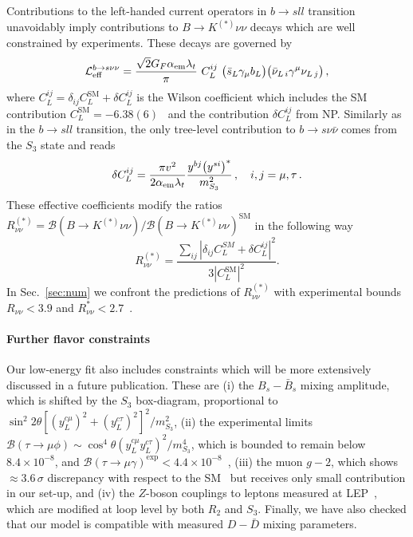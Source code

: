\documentclass[aps,prd,superscriptaddress,twocolumn,secnumarabic]{revtex4-1}
\begin{document}
Contributions to the left-handed current operators in $b\to s l l$ transition unavoidably imply contributions to $B\to K^{(\ast)}\nu\nu$ decays which are well constrained by experiments. These decays are governed by
%
\begin{equation}
\mathcal{L}_{\mathrm{eff}}^{b\to s\nu\nu}= \dfrac{\sqrt{2}G_F \alpha_{\mathrm{em}} \lambda_t}{\pi} ~C_L^{ij}~\big{(}\bar{s}_L\gamma_\mu b_L\big{)}\big{(}\bar{\nu}_{L\,i} \gamma^\mu \nu_{L\,j} \big{)}\,,
\end{equation}
%
where $C_L^{ij}=\delta_{ij}C_{L}^{\mathrm{SM}}+\delta C_L^{ij}$ is the Wilson coefficient which includes the SM contribution $C_{L}^{\mathrm{SM}}=-6.38(6)$~\cite{Altmannshofer:2009ma} and the contribution $\delta C_L^{ij}$ from NP. Similarly as in the $b\to s l l$ transition, the only tree-level contribution to $b\to s \nu\bar{\nu}$ comes from the $S_3$ state and reads~\cite{Dorsner:2017ufx}
%
\begin{equation}
\delta C_L^{ij} = \dfrac{\pi v^2}{2\alpha_{\mathrm{em}} \lambda_t} \dfrac{y^{bj} \big{(}y^{si}\big{)}^\ast}{m_{S_3}^2}\,,\quad i,j=\mu,\tau\,.
\end{equation}
%
These effective coefficients modify the ratios $R_{\nu\nu}^{(\ast)}=\mathcal{B}(B\to K^{(\ast)}\nu\nu)/\mathcal{B}(B\to K^{(\ast)}\nu\nu)^{\mathrm{SM}}$ in the following way
%
\begin{equation}
\label{eq:Rnunu}
R_{\nu\nu}^{(\ast)} = \dfrac{\sum_{ij}|\delta_{ij}C_L^{SM}+\delta C_{L}^{ij}|^2}{3|C_L^{\mathrm{SM}}|^2}.
\end{equation}
%
In Sec.~\ref{sec:num} we confront the predictions of $R_{\nu\nu}^{(\ast)}$ with experimental bounds $R_{\nu\nu}<3.9$ and $R_{\nu\nu}^{\ast}<2.7$~\cite{Grygier:2017tzo}.

\paragraph*{Further flavor constraints}
Our low-energy fit also includes constraints which will be more
extensively discussed in a future publication. These are (i) the
$B_s-\bar{B}_s$ mixing amplitude, which is shifted by the $S_3$
box-diagram, proportional to %
$\sin^2 2\theta \left[(y_L^{c\mu})^2 + (y_L^{c\tau})^2\right]^2/m_{S_3}^2$, (ii)
the experimental limits 
$\mathcal{B}(\tau\to\mu\phi) \sim \cos^4 \theta (y_L^{c\mu} y_L^{c\tau})^2/m_{S_3}^4$, which is bounded to remain below  $8.4\times 10^{-8}$, and
$\mathcal{B}(\tau\to\mu\gamma)^{\mathrm{exp}}<4.4\times
10^{-8}$~\cite{Patrignani:2016xqp}, (iii) the muon $g-2$, which shows
$\approx 3.6\,\sigma$ discrepancy with respect to the
SM~\cite{Beringer:1900zz} but receives only small contribution in our
set-up, and (iv) the $Z$-boson couplings to leptons measured at
LEP~\cite{ALEPH:2005ab}, which are modified at loop level by both
$R_2$ and $S_3$.  Finally, we have also checked that our model is
compatible with measured $D-\bar D$ mixing parameters.
\end{document}
